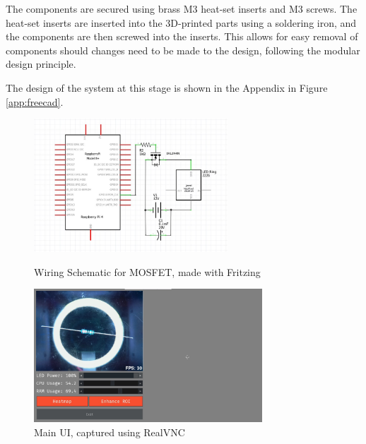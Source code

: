 The components are secured using brass M3 heat-set inserts and M3 screws. The heat-set inserts are inserted into the 3D-printed parts using a soldering iron,
and the components are then screwed into the inserts. This allows for easy removal of components should changes need to be made to the design, following
the modular design principle.

The design of the system at this stage is shown in the Appendix in Figure \ref{app:freecad}.
\begin{figure}
    \begin{minipage}[t]{0.49\textwidth}
      \centering
      \includegraphics[width=\textwidth,height=5cm, keepaspectratio]{imgs/diagrams/wiring.jpg}
      \caption{Wiring Schematic for MOSFET, made with Fritzing\cite{fritzing}}
      \label{fig:wiringschematic}
    \end{minipage}
    \hfill
    \begin{minipage}[t]{0.49\textwidth}
        \centering
        \includegraphics[width=\textwidth,height=5cm, keepaspectratio]{imgs/software/realvnc.jpg}
        \caption{Main UI, captured using RealVNC\cite{realvnc}}
        \label{fig:mainui}
    \end{minipage}
  \end{figure}
  